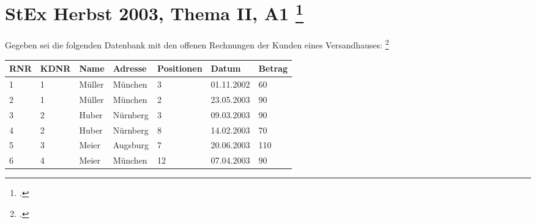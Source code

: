 \documentclass{lehramt-informatik-aufgabe}
\begin{document}


\section{StEx Herbst 2003, Thema II, A1
\footcite[Thema 2 Aufgabe 1]{66113:2003:09}
}

Gegeben sei die folgenden Datenbank mit den offenen Rechnungen der
Kunden eines Versandhauses:
\footcite[Seite 2 Aufgabe 4]{db:ab:5}

\begin{tabular}{|l|l|l|l|l|l|l|}
\textbf{RNR} & \textbf{KDNR} & \textbf{Name} & \textbf{Adresse} & \textbf{Positionen} & \textbf{Datum} & \textbf{Betrag}
\\\hline
1   & 1    & Müller & München  & 3          & 01.11.2002 & 60     \\
2   & 1    & Müller & München  & 2          & 23.05.2003 & 90     \\
3   & 2    & Huber  & Nürnberg & 3          & 09.03.2003 & 90     \\
4   & 2    & Huber  & Nürnberg & 8          & 14.02.2003 & 70     \\
5   & 3    & Meier  & Augsburg & 7          & 20.06.2003 & 110    \\
6   & 4    & Meier  & München  & 12         & 07.04.2003 & 90
\end{tabular}
\end{document}
